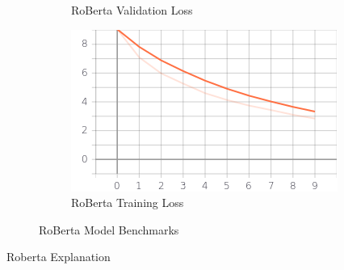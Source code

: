 \documentclass[a4paper,12pt]{report}
\begin{document}
\begin{figure}
\begin{subfigure}[b]{0.475\textwidth}
		\caption{\small RoBerta Validation Loss}    
		\label{robertaValLoss}
	\end{subfigure}
	\hfill
	\begin{subfigure}[b]{0.475\textwidth}
		\centering 
		\includegraphics[width=\textwidth]{../images/Roberta_Train_Loss.png}
		\caption{\small RoBerta Training Loss}  
		\label{robertaTrainloss}
	\end{subfigure}
	\caption{RoBerta Model Benchmarks} 
	\label{robertaBenchmarks}
\end{figure}

Roberta Explanation
\end{document}
